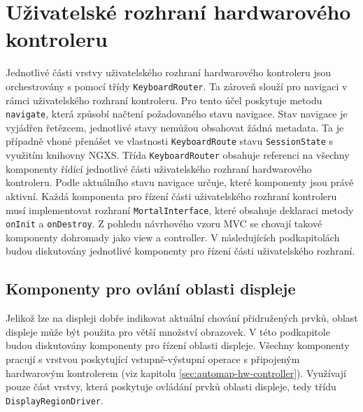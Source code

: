 \documentclass[thesis=M,czech]{FITthesis}[2019/03/06]
\begin{document}
	\section{Uživatelské rozhraní hardwarového kontroleru}
		Jednotlivé části vrstvy uživatelského rozhraní hardwarového kontroleru jsou orchestrovány s pomocí třídy \texttt{KeyboardRouter}.
		Ta zároveň slouží pro navigaci v rámci uživatelského rozhraní kontroleru. Pro tento účel poskytuje metodu \texttt{navigate}, která
		způsobí načtení požadovaného stavu navigace. Stav navigace je vyjádřen řetězcem, jednotlivé stavy nemůžou obsahovat žádná metadata. Ta je případně
		vhoné přenášet ve vlastnosti \texttt{KeyboardRoute} stavu \texttt{SessionState} s využitím knihovny NGXS. Třída \texttt{KeyboardRouter} obsahuje referenci na všechny komponenty řídící jednotlivé 
		části uživatelského rozhraní hardwarového kontroleru. Podle aktuálního stavu navigace určuje, které komponenty jsou právě aktivní. 
		Každá komponenta pro řízení části uživatelského rozhraní kontroleru musí implementovat rozhraní \texttt{MortalInterface}, které obsahuje deklaraci metody \texttt{onInit} a \texttt{onDestroy}.
		Z pohledu návrhového vzoru MVC\cite{reenskaug1979original} se chovají takové komponenty dohromady jako view a controller. V následujících podkapitolách
		budou diskutovány jednotlivé komponenty pro řízení části uživatelského rozhraní.
		
		\subsection{Komponenty pro ovlání oblasti displeje}\label{sec:display-area-components}
			Jelikož lze na displeji dobře indikovat aktuální chování přidružených prvků, oblast displeje může být použita pro větší množství obrazovek.
			V této podkapitole budou diskutovány komponenty pro řízení oblasti displeje. Všechny komponenty pracují s vrstvou poskytující vstupně-výstupní operace s připojeným hardwarovým kontrolerem (viz kapitolu \ref{sec:automap-hw-controller}). Využívají pouze část vrstvy, která poskytuje ovládání prvků oblasti displeje, tedy třídu \texttt{Display\-Region\-Driver}.
					
\end{document}
